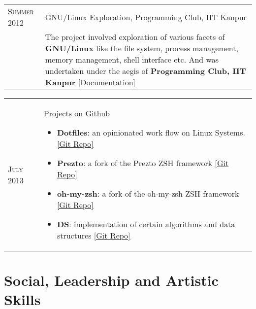 \documentclass[a4paper,10pt]{article} %
\begin{document}
\begin{tabular}{>{\raggedleft}p{2.2cm}|p{15cm}}
    \textsc{Summer 2012} & GNU/Linux Exploration, Programming Club, IIT Kanpur\\
                           & \footnotesize{ The project involved exploration of various facets of
                             \textbf{GNU/Linux} like the file system, process management,
                             memory management, shell interface etc. And was
                             undertaken under the aegis of \textbf{Programming Club, IIT Kanpur}
                             \href{https://docs.google.com/document/d/1ZHO9w36aoq3oaZBR4Um1AOmDfiTDAEgM6baQAu3icw4/edit?usp=sharing}
                             {[Documentation]} } \\
\end{tabular}

\begin{tabular}{>{\raggedleft}p{2.2cm}|p{15cm}}
    \textsc{July 2013} & Projects on Github
                         \footnotesize{
                             \begin{itemize}[leftmargin=*]
                                 \item \textbf{Dotfiles}: an opinionated work flow on Linux Systems.
                                     \href{https://github.com/srijanshetty/dotfiles} {[Git Repo]}
                                 \item \textbf{Prezto}: a fork of the Prezto ZSH framework
                                     \href{https://github.com/srijanshetty/prezto} {[Git Repo]}
                                 \item \textbf{oh-my-zsh}: a fork of the oh-my-zsh ZSH framework
                                     \href{https://github.com/srijanshetty/oh-my-zsh} {[Git Repo]}
                                 \item \textbf{DS}: implementation of certain algorithms and data structures
                                     \href{https://github.com/srijanshetty/DS} {[Git Repo]}
                             \end{itemize}
                         }\\
\end{tabular}


\section {Social, Leadership and Artistic Skills}
\end{document}
